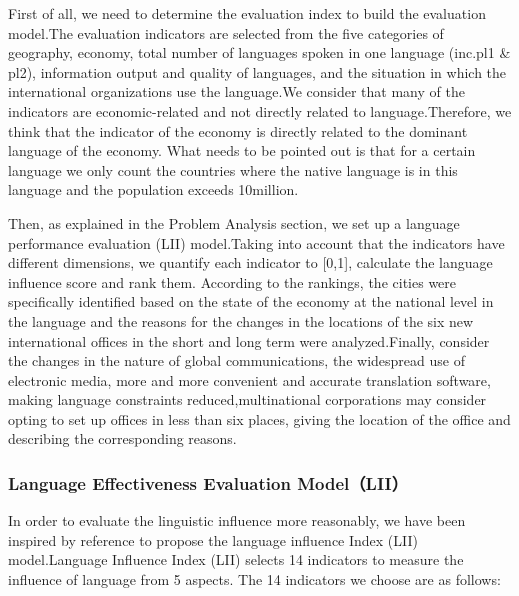 \par First of all, we need to determine the evaluation index to build the evaluation model.The evaluation indicators are selected from the five categories of geography, economy, total number of languages spoken in one language (inc.pl1 \& pl2), information output and quality of languages, and the situation in which the international organizations use the language.We consider that many of the indicators are economic-related and not directly related to language.Therefore, we think that the indicator of the economy is directly related to the dominant language of the economy. What needs to be pointed out is that for a certain language we only count the countries where the native language is in this language and the population exceeds 10million.
\par Then, as explained in the Problem Analysis section, we set up a language performance evaluation (LII) model.Taking into account that the indicators have different dimensions, we quantify each indicator to [0,1], calculate the language influence score and rank them. According to the rankings, the cities were specifically identified based on the state of the economy at the national level in the language and the reasons for the changes in the locations of the six new international offices in the short and long term were analyzed.Finally, consider the changes in the nature of global communications, the widespread use of electronic media, more and more convenient and accurate translation software, making language constraints reduced,multinational corporations may consider opting to set up offices in less than six places, giving the location of the office and describing the corresponding reasons.

\subsubsection{Language Effectiveness Evaluation Model（LII）} 

\noindent In order to evaluate the linguistic influence more reasonably, we have been inspired by reference to propose the language influence Index (LII) model.Language Influence Index (LII) selects 14 indicators to measure the influence of language from 5 aspects. The 14 indicators we choose are as follows:

